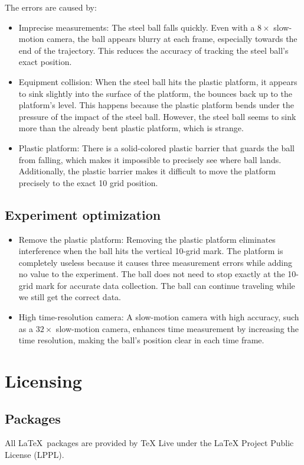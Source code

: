 \documentclass[a4paper,12pt]{article}
\begin{document}
	The errors are caused by:
	\begin{itemize}
		\item Imprecise measurements: The steel ball falls quickly. Even with a $8\times$ slow-motion camera, the ball appears blurry at each frame, especially towards the end of the trajectory. This reduces the accuracy of tracking the steel ball's exact position. 
		\item Equipment collision: When the steel ball hits the plastic platform, it appears to sink slightly into the surface of the platform, the bounces back up to the platform's level. This happens because the plastic platform bends under the pressure of the impact of the steel ball. However, the steel ball seems to sink more than the already bent plastic platform, which is strange. 
		\item Plastic platform: There is a solid-colored plastic barrier that guards the ball from falling, which makes it impossible to precisely see where ball lands. Additionally, the plastic barrier makes it difficult to move the platform precisely to the exact 10 grid position. 
	\end{itemize}
	
	\subsection{Experiment optimization}
	\begin{itemize}
		\item Remove the plastic platform: Removing the plastic platform eliminates interference when the ball hits the vertical 10-grid mark. The platform is completely useless because it causes three measurement errors while adding no value to the experiment. The ball does not need to stop exactly at the 10-grid mark for accurate data collection. The ball can continue traveling while we still get the correct data.
		\item High time-resolution camera: A slow-motion camera with high accuracy, such as a $32\times$ slow-motion camera, enhances time measurement by increasing the time resolution, making the ball's position clear in each time frame. 
	\end{itemize}
	\newpage
	
	
	
	
	\section{Licensing}
	\subsection{Packages}
	All \LaTeX\, packages are provided by TeX Live under the LaTeX Project Public License (LPPL).\\
	
\end{document}

